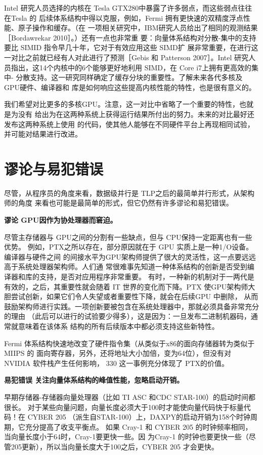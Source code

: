 Intel 研究人员选择的内核在 Tesla GTX280中暴露了许多弱点，而这些弱点往往在Tesla 的
后续体系结构中得以克服，例如，Fermi 拥有更快速的双精度浮点性能、原子操作和缓存。（在
一项相关研究中，IBM研究人员给出了相同的观测结果［Bordawrekar 2010］。）还有一点也非常重
要：向量体系结构对分散-集中的支持要比 SIMID 指令早几十年，它对于有效应用这些 SIMD扩
展非常重要，在进行这一对比之前就已经有人对此进行了预测［Gebis 和 Patterson 2007］。Intel
研究人员指出，这14个内核中的6个能够更好地利用 SIMD，在 Core i7上拥有更高效的集中-
分散支持。这一研究同样确定了缓存分块的重要性。了解未来各代多核及 GPU硬件、编译器和
库是如何响应这些提高内核性能的特性，也是很有意义的。

我们希望对比更多的多核GPU。注意，这一对比中省略了一个重要的特性，也就是为没有
给出为在这两种系统上获得运行结果所付出的努力。未来的对比最好还发布这两种系统上使用
的代码，使其他人能够在不同硬件平台上再现相同试验，并可能对结果进行改进。

\section{谬论与易犯错误}
尽管，从程序员的角度来看，数据级并行是 TLP之后的最简单并行形式，从架构师的角度
来看也可能是最简单的形式，但它仍然有许多谬论和易犯错误。

\textbf{谬论 GPU因作为协处理器而窘迫。}

尽管主存储器与 GPU之间的分割有一些缺点，但与 CPU保持一定距离也有一些优势。
例如，PTX之所以存在，部分原因就在于 GPU 实质上是一种1/O设备。编译器与硬件之间
的间接水平为GPU架构师提供了很大的灵活性，这一点要远远高于系统处理器架构师。人们通
常很难事先知道一种体系结构的创新是否受到编译器和库的支持，是否对应用程序非常重要。
有时，一种新的机制对于一两代是有效的，之后，其重要性就会随着 IT 世界的变化而下降。PTX
使GPU架构师大胆尝试创新，如果它们令人失望或者重要性下降，就会在后续GPU 中删除，
从而鼓励架构师进行实践。一项创新要被包含在系统处理器中，那就必须具备非常充分的理由
（此后可以进行的试验要少得多），这是因为：一旦发布二进制机器码，通常就意味着在该体系
结构的所有后续版本中都必须支持这些新特性。

Fermi 体系结构快速地改变了硬件指令集（从类似于x86的面向存储器转为类似于MIIPS 的
面向寄存器，另外，还将地址大小加倍，变为64位），但没有对 NVIDIA 软件栈产生任何影响，
330
这一事例充分体现了 PTX的价值。

\textbf{易犯错误 关注向量体系结构的峰值性能，忽略启动开销。}

早期存储器-存储器向量处理器（比如 TI ASC 和CDC STAR-100）的启动时间都很长。
对于某些向量问题，向量长度必须大于100时才能使向量代码快于标量代码！在 CYBER 205
（派生自STAR-100）上，DAXPY的启动开销为158个时钟周期，它充分提高了收支平衡点。
如果 Cray-1 和 CYBER 205 的时钟频率相同，当向量长度小于64时，Cray-1要更快一些。因
为Cray-1 的时钟也要更快一些（尽管205更新），所以当向量长度大于100之后，CYBER 205
才会更快。

